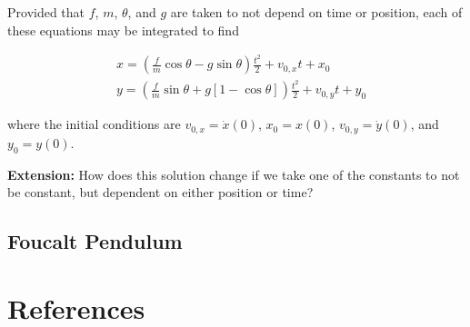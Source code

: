 \documentclass[main.tex]{subfiles}
\begin{document}
\begin{appendices}
Provided that $f$, $m$, $\theta$, and $g$ are taken to not depend on time or position,
each of these equations may be integrated to find

\begin{align*}
& x = \left( \frac{f}{m} \cos \theta - g \sin \theta \right) \frac{t^2}{2} + v_{0,x} t
+ x_0 \\
& y = \left( \frac{f}{m} \sin \theta + g \left[ 1 - \cos \theta \right] \right) \frac{t^2}{2}
+ v_{0,y} t + y_0
\end{align*}

where the initial conditions are $v_{0,x} = \dot{x}(0)$, $x_0 = x(0)$, $v_{0,y} =
\dot{y}(0)$, and $y_0 = y(0)$.

\textbf{Extension:} How does this solution change if we take one of the constants to not be constant, but
dependent on either position or time?


\section{Foucalt Pendulum}

\chapter{References}



\end{appendices}
\end{document}
